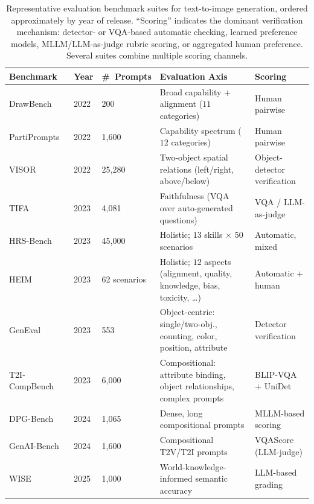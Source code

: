 \begin{table}[!ht]
\centering
\fontsize{9}{11}\selectfont
\setlength{\tabcolsep}{1.0mm}
\caption{Representative evaluation benchmark suites for text-to-image generation, ordered approximately by year of release. ``Scoring'' indicates the dominant verification mechanism: detector- or VQA-based automatic checking, learned preference models, MLLM/LLM-as-judge rubric scoring, or aggregated human preference. Several suites combine multiple scoring channels.}
\label{tab:p3_s8_1_1_eval_benchmarks}
\begin{tabular}{L{0.17\textwidth} C{0.06\textwidth} C{0.11\textwidth} L{0.33\textwidth} L{0.25\textwidth}}
\toprule
\textbf{Benchmark} & \textbf{Year} & \textbf{\#~Prompts} & \textbf{Evaluation Axis} & \textbf{Scoring} \\
\midrule
DrawBench~\cite{saharia2022photorealistic}       & 2022 & 200   & Broad capability + alignment ($11$ categories) & Human pairwise \\
PartiPrompts~\cite{parti2022}     & 2022 & 1{,}600 & Capability spectrum ($12$ categories) & Human pairwise \\
VISOR~\cite{gokhale2022visor}     & 2022 & 25{,}280 & Two-object spatial relations (left/right, above/below) & Object-detector verification \\
TIFA~\cite{hu2023tifa}            & 2023 & 4{,}081 & Faithfulness (VQA over auto-generated questions) & VQA / LLM-as-judge \\
HRS-Bench~\cite{bakr2023hrsbench} & 2023 & 45{,}000 & Holistic; $13$ skills $\times$ $50$ scenarios & Automatic, mixed \\
HEIM~\cite{lee2023heim}           & 2023 & 62 scenarios & Holistic; $12$ aspects (alignment, quality, knowledge, bias, toxicity, \ldots) & Automatic $+$ human \\
GenEval~\cite{ghosh2023geneval}   & 2023 & 553   & Object-centric: single/two-obj., counting, color, position, attribute & Detector verification \\
T2I-CompBench~\cite{huang2023t2icompbench} & 2023 & 6{,}000 & Compositional: attribute binding, object relationships, complex prompts & BLIP-VQA $+$ UniDet \\
DPG-Bench~\cite{hu2024ella}       & 2024 & 1{,}065 & Dense, long compositional prompts & MLLM-based scoring \\
GenAI-Bench~\cite{li2024genaibench} & 2024 & 1{,}600 & Compositional T2V/T2I prompts & VQAScore (LLM-judge) \\
WISE~\cite{niu2025wise}           & 2025 & 1{,}000 & World-knowledge-informed semantic accuracy & LLM-based grading \\
\bottomrule
\end{tabular}
\end{table}

